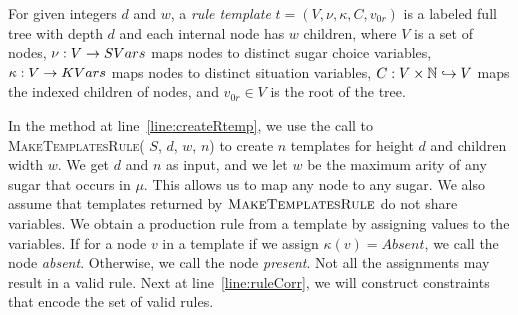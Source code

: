 \begin{df}
For given integers $d$ and $w$,
a {\em rule template} $t = (V, \nu, \kappa, C, v_{0r})$ is a labeled full tree with depth $d$ and 
each internal node has $w$ children, where 
$V$ is a set of nodes, $\nu : V \rightarrow SVars$ maps nodes to distinct
sugar choice variables, 
$\kappa : V \rightarrow KVars$ maps nodes to distinct situation variables,
$C : V \times \mathbb{N} \hookrightarrow V$ maps the indexed children of nodes,
and
$v_{0r} \in V$ is the root of the tree.
\end{df}
In the method at line~\ref{line:createRtemp}, we use the
call to \textsc{MakeTemplatesRule}( $S$, $d$, $w$, $n$) to create $n$ templates for
height $d$ and children width $w$. We get $d$ and $n$ as input, and
we let $w$ be the maximum arity of any sugar that occurs in $\mu$.
This allows us to map any node to any sugar.
We also assume that templates
returned by $\textsc{MakeTemplatesRule}$ do not share variables.
We obtain a production rule from a template by assigning values
to the variables.
If for a node $v$ in a template if we assign $\kappa(v) = Absent$,
we call the node {\em absent}. Otherwise, we call the node {\em present}.
Not all the assignments may result in a valid rule.
Next at line~\ref{line:ruleCorr}, we will construct constraints
that encode the set of valid rules. 

